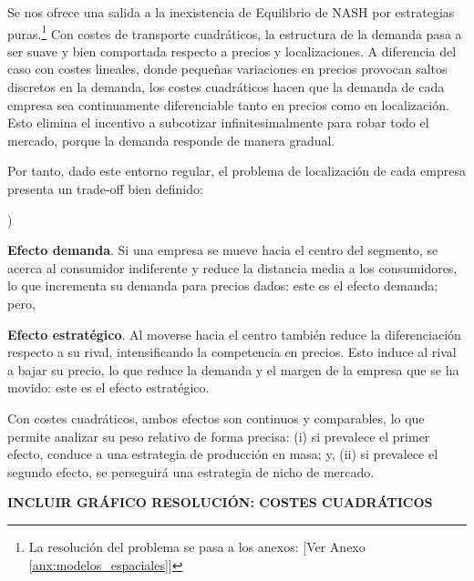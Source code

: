 \documentclass[10pt,a4paper]{article}
\newcounter{alphaitem}
\newenvironment{la}
      {\begin{list}{\alph{alphaitem})}{%
          \usecounter{alphaitem}%
          \setlength{\leftmargin}{1cm}%
          \setlength{\parskip}{3pt}%
          \setlength{\itemsep}{0pt}%
          \setlength{\parsep}{0pt}%
      }}
      {\end{list}}
\newcommand{\authorfont}[1]{{\fontfamily{EBGaramond-TLF}\selectfont #1}}
\newcounter{anexo}
\begin{document}
Se nos ofrece una salida a la inexistencia de Equilibrio de NASH por estrategias puras.\footnote{%
    La resolución del problema se pasa a los anexos: [\authorfont{Ver Anexo \ref{anx:modelos_espaciales}}]
} Con costes de transporte cuadráticos, la estructura de la demanda pasa a ser suave y bien comportada respecto a precios y localizaciones. A diferencia del caso con costes lineales, donde pequeñas variaciones en precios provocan saltos discretos en la demanda, los costes cuadráticos hacen que la demanda de cada empresa sea continuamente diferenciable tanto en precios como en localización. Esto elimina el incentivo a subcotizar infinitesimalmente para robar todo el mercado, porque la demanda responde de manera gradual. 

Por tanto, dado este entorno regular, el problema de localización de cada empresa presenta un trade-off bien definido:
\begin{la}
    \item \textbf{Efecto demanda}. Si una empresa se mueve hacia el centro del segmento, se acerca al consumidor indiferente y reduce la distancia media a los consumidores, lo que incrementa su demanda para precios dados: este es el efecto demanda; pero,
    \item \textbf{Efecto estratégico}. Al moverse hacia el centro también reduce la diferenciación respecto a su rival, intensificando la competencia en precios. Esto induce al rival a bajar su precio, lo que reduce la demanda y el margen de la empresa que se ha movido: este es el efecto estratégico.
\end{la} 

Con costes cuadráticos, ambos efectos son continuos y comparables, lo que permite analizar su peso relativo de forma precisa: (i) si prevalece el primer efecto, conduce a una estrategia de producción en masa; y, (ii) si prevalece el segundo efecto, se perseguirá una estrategia de nicho de mercado. 

\textbf{INCLUIR GRÁFICO RESOLUCIÓN: COSTES CUADRÁTICOS}
\end{document}

